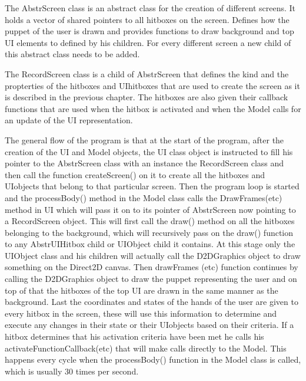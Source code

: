 The Abstr\textunderscore Screen class is an abstract class for the creation of different screens. It holds a vector of shared pointers to all hitboxes on the screen. Defines how the puppet of the user is drawn and provides functions to draw background and top UI elements to defined by his children. For every different screen a new child of this abstract class needs to be added.

The RecordScreen class is a child of Abstr\textunderscore Screen that defines the kind and the propterties of the hitboxes and UI\textunderscore hitboxes that are used to create the screen as it is described in the previous chapter. The hitboxes are also given their callback functions that are used when the hitbox is activated and when the Model calls for an update of the UI representation.

The general flow of the program is that at the start of the program, after the creation of the UI and Model objects, the UI class object is instructed to fill his pointer to the Abstr\textunderscore Screen class with an instance the RecordScreen class and then call the function createScreen() on it to create all the hitboxes and UI\textunderscore objects that belong to that particular screen. Then the program loop is started and the processBody() method in the Model class calls the DrawFrames(etc) method in UI which will pass it on to its pointer of Abstr\textunderscore Screen now pointing to a RecordScreen object. This will first call the draw() method on all the hitboxes belonging to the background, which will recursively pass on the draw() function to any Abstr\textunderscore UI\textunderscore Hitbox child or UI\textunderscore Object child it contains. At this stage only the UI\textunderscore Object class and his children will actually call the D2D\textunderscore Graphics object to draw something on the Direct2D canvas. Then drawFrames (etc) function continues by calling the D2D\textunderscore Graphics object to draw the puppet representing the user and on top of that the hitboxes of the top UI are drawn in the same manner as the background. Last the coordinates and states of the hands of the user are given to every hitbox in the screen, these will use this information to determine and execute any changes in their state or their UI\textunderscore objects based on their criteria. If a hitbox determines that his activation criteria have been met he calls his activateFunctionCallback(etc) that will make calls directly to the Model. This happens every cycle when the processBody() function in the Model class is called, which is usually 30 times per second.

